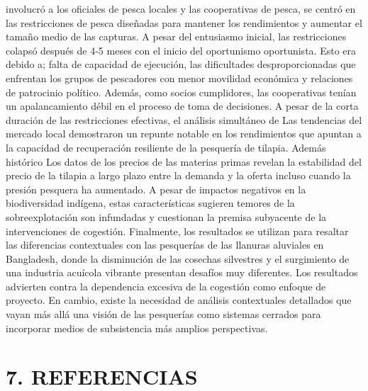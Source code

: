 \documentclass[
]{article}
\begin{document}
involucró a los oficiales de pesca locales y las cooperativas de pesca,
se centró en las restricciones de pesca diseñadas para mantener los
rendimientos y aumentar el tamaño medio de las capturas. A pesar del
entusiasmo inicial, las restricciones colapsó después de 4-5 meses con
el inicio del oportunismo oportunista. Esto era debido a; falta de
capacidad de ejecución, las dificultades desproporcionadas que enfrentan
los grupos de pescadores con menor movilidad económica y relaciones de
patrocinio político. Además, como socios cumplidores, las cooperativas
tenían un apalancamiento débil en el proceso de toma de decisiones. A
pesar de la corta duración de las restricciones efectivas, el análisis
simultáneo de Las tendencias del mercado local demostraron un repunte
notable en los rendimientos que apuntan a la capacidad de recuperación
resiliente de la pesquería de tilapia. Además histórico Los datos de los
precios de las materias primas revelan la estabilidad del precio de la
tilapia a largo plazo entre la demanda y la oferta incluso cuando la
presión pesquera ha aumentado. A pesar de impactos negativos en la
biodiversidad indígena, estas características sugieren temores de la
sobreexplotación son infundadas y cuestionan la premisa subyacente de la
intervenciones de cogestión. Finalmente, los resultados se utilizan para
resaltar las diferencias contextuales con las pesquerías de las llanuras
aluviales en Bangladesh, donde la disminución de las cosechas silvestres
y el surgimiento de una industria acuícola vibrante presentan desafíos
muy diferentes. Los resultados advierten contra la dependencia excesiva
de la cogestión como enfoque de proyecto. En cambio, existe la necesidad
de análisis contextuales detallados que vayan más allá una visión de las
pesquerías como sistemas cerrados para incorporar medios de subsistencia
más amplios perspectivas.

\hypertarget{referencias}{%
\section{7. REFERENCIAS}\label{referencias}}
\end{document}
